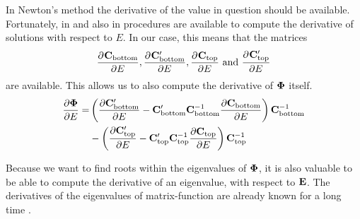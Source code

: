 In Newton's method the derivative of the value in question should be available. Fortunately, in \cite{ixaru_lilix_2002} and also in \cite{ledoux_cpmp_2006} procedures are available to compute the derivative of solutions with respect to $E$. In our case, this means that the matrices
$$
    \pdv[]{\vb{C}_\text{bottom}}{E}, \pdv[]{\vb{C}_\text{bottom}'}{E}, \pdv[]{\vb{C}_\text{top}}{E} \text{ and } \pdv[]{\vb{C}_\text{top}'}{E}
$$
are available. This allows us to also compute the derivative of $\vb{\Phi}$ itself.
\begin{align*}
    \pdv{\vb{\Phi}}{E} = & \left(\pdv{\vb{C}_\text{bottom}'}{E} - \vb{C}_\text{bottom}'\vb{C}_\text{bottom}^{-1}\pdv{\vb{C}_\text{bottom}}{E}\right) \vb{C}_\text{bottom}^{-1} \\
                         & - \left(\pdv{\vb{C}_\text{top}'}{E} - \vb{C}_\text{top}'\vb{C}_\text{top}^{-1}\pdv{\vb{C}_\text{top}}{E}\right) \vb{C}_\text{top}^{-1}
\end{align*}

Because we want to find roots within the eigenvalues of $\vb{\Phi}$, it is also valuable to be able to compute the derivative of an eigenvalue, with respect to $\vb{E}$. The derivatives of the eigenvalues of matrix-function are already known for a long time \cite{lancaster_eigenvalues_1964}.

